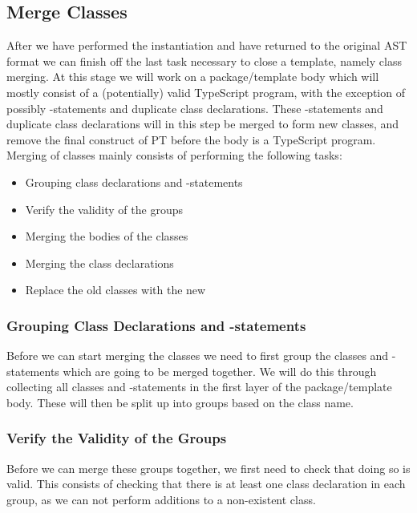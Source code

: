 \subsection{Merge Classes}\label{subsec:merging-class-declarations}

After we have performed the instantiation and have returned to the original AST format we can finish off the last task necessary to close a template, namely class merging.
At this stage we will work on a package/template body which will mostly consist of a (potentially) valid TypeScript program, with the exception of possibly -statements and duplicate class declarations.
These -statements and duplicate class declarations will in this step be merged to form new classes, and remove the final construct of PT before the body is a TypeScript program.
Merging of classes mainly consists of performing the following tasks:

\begin{itemize}
    \item Grouping class declarations and -statements
    \item Verify the validity of the groups
    \item Merging the bodies of the classes
    \item Merging the class declarations
    \item Replace the old classes with the new
\end{itemize}

\subsubsection{Grouping Class Declarations and -statements}

Before we can start merging the classes we need to first group the classes and -statements which are going to be merged together.
We will do this through collecting all classes and -statements in the first layer of the package/template body.
These will then be split up into groups based on the class name.

\subsubsection{Verify the Validity of the Groups}

Before we can merge these groups together, we first need to check that doing so is valid.
This consists of checking that there is at least one class declaration in each group, as we can not perform additions to a non-existent class.

